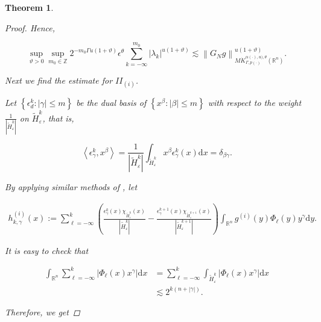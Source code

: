 \documentclass[oneside,reqno]{amsart}
\newtheorem{theorem}{Theorem}[section]
\numberwithin{equation}{section}
\theoremstyle{definition}
\begin{document}
\begin{theorem}
\begin{proof}
Hence,


\begin{equation*}
\sup_{\vartheta>0 } \sup _{m_0\in  \mathbb{Z}} 2^{-m_0\Gamma u(1+\vartheta)}\epsilon  ^\theta \sum_{k=-\infty}^{m_0}\left|\lambda_{k}\right|^{u(1+\vartheta)} \lesssim\left\|G_{N}g \right\|_{M \dot{K} ^{\alpha(\cdot),u),\theta}_{ \Gamma, p(\cdot)}(\mathbb{R}^n)}^{u(1+\vartheta)} .
\end{equation*}


Next we find the estimate for $I I_{(i)}$.


Let $\left\{\epsilon  _{d}^{k}:|\gamma| \leq  m\right\}$ be the dual basis of $\left\{x^{\beta}:|\beta| \leq  m\right\}$ with respect to the weight $\frac{1} {\left|\widetilde{H}^k_{ \varepsilon}\right|}$ on $\widetilde{H}^k_{ \varepsilon}$, that is,


\begin{equation*}
\left\langle\epsilon  _{\gamma}^{k}, x^{\beta}\right\rangle=\frac{1}{\left|\widetilde{H}^k_{ \varepsilon}\right|} \int_{\widetilde{H}^k_{ \varepsilon}} x^{\beta} \epsilon  _{\gamma}^{k}(x) \mathrm{d} x=\delta_{\beta \gamma} . 
\end{equation*}

By applying similar methods of \cite{48},
let


\begin{align*}
h_{k, \gamma}^{(i)}(x):=  \sum_{\ell=-\infty }^{k}\left(\frac{\epsilon  _{\gamma}^{k}(x) \chi_{\widetilde{H}^k_{ \varepsilon}}(x)}{\left|\widetilde{H}^k_{ \varepsilon}\right|}-\frac{\epsilon  _{\gamma}^{k+1}(x) \chi_{\widetilde{H}^{k+1}_{ \varepsilon}}(x)}{\left|\widetilde{H}^{k+1}_{ \varepsilon}\right|}\right)  \int_{\mathbb{R}^{n}} g^{(i)}(y) \Phi_\ell (y) y^{\gamma} \mathrm{d} y . 
\end{align*}

It is easy to check that


\begin{align*}
\int_{\mathbb{R}^{n}} \sum_{\ell=-\infty }^{k}\left|\Phi_\ell (x) x^{\gamma}\right| \mathrm{d} x & =\sum_{\ell=-\infty }^{k} \int_{\widetilde{H}^k_{ \varepsilon}}\left|\Phi_\ell (x) x^{\gamma}\right| \mathrm{d} x  \\
& \lesssim 2^{k(n+|\gamma|)} .
\end{align*}


Therefore, we get 



\end{proof}
\end{theorem}
\end{document}
